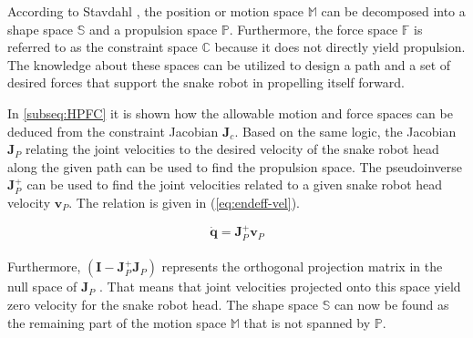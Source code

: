 According to Stavdahl \cite{StavdahlNote}, the position or motion space $\mathbb{M}$ can be decomposed into a shape space $\mathbb{S}$ and a propulsion space $\mathbb{P}$. Furthermore, the force space $\mathbb{F}$ is referred to as the constraint space $\mathbb{C}$ because it does not directly yield propulsion. The knowledge about these spaces can be utilized to design a path and a set of desired forces that support the snake robot in propelling itself forward.

In \ref{subseq:HPFC} it is shown how the allowable motion and force spaces can be deduced from the constraint Jacobian $\mathbf{J}_c$. Based on the same logic, the Jacobian $\mathbf{J}_P$ relating the joint velocities to the desired velocity of the snake robot head along the given path can be used to find the propulsion space. The pseudoinverse $\mathbf{J}^+_P$ can be used to find the joint velocities related to a given snake robot head velocity $\mathbf{v}_P$. The relation is given in (\ref{eq:endeff-vel}).

\begin{equation}\label{eq:endeff-vel}
    \dot{\mathbf{q}} = \mathbf{J}^+_P \mathbf{v}_P
\end{equation}
\\
Furthermore, $(\mathbf{I} - \mathbf{J}^+_P \mathbf{J}_P)$ represents the orthogonal projection matrix in the null space of $\mathbf{J}_P$ \cite{chiaverini2008kinematically}. That means that joint velocities projected onto this space yield zero velocity for the snake robot head. The shape space $\mathbb{S}$ can now be found as the remaining part of the motion space $\mathbb{M}$ that is not spanned by $\mathbb{P}$.

